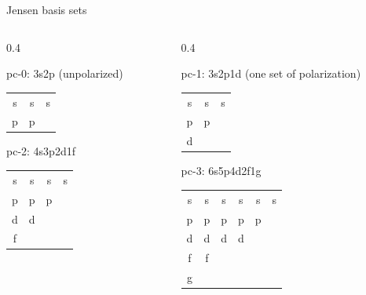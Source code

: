 \documentclass[aspectratio=169,9pt]{beamer}
\newcommand{\red}[1]{\textcolor{hfRed}{#1}}
\newcommand{\green}[1]{\textcolor{hfGreen}{#1}}
\newcommand{\blue}[1]{\textcolor{hfBlue}{#1}}
\newcommand{\violet}[1]{\textcolor{hfViolet}{#1}}
\begin{document}
\begin{frame}{Jensen basis sets}
\small
	\begin{columns}
		\begin{column}[t]{0.4\textwidth}
        	\begin{block}{pc-0: \small 3s2p (unpolarized)}
        		\begin{tabular}{ccc}
        			\green{s} & \green{s} & \green{s} \\
        			\green{p} & \green{p} \\
        		\end{tabular}
        	\end{block}
        	\begin{block}{pc-2: \small 4s3p2d1f}
        		\begin{tabular}{cccc}
        			\green{s} & \green{s} & \green{s} & \blue{s} \\
        			\green{p} & \green{p} & \blue{p} \\
        			\red{d} & \blue{d} \\
        			\blue{f} \\
        		\end{tabular}
        	\end{block}
		\end{column}
		\begin{column}[t]{0.4\textwidth}
        	\begin{block}{pc-1: \small 3s2p\red{1d} (one set of polarization)}
        		\begin{tabular}{ccc}
        			\green{s} & \green{s} & \green{s} \\
        			\green{p} & \green{p} \\
        			\red{d} 
        		\end{tabular}
        	\end{block}
        	\begin{block}{pc-3: \small 6s5p4d2f1g}
        		\begin{tabular}{cccccc}
        			\green{s} & \green{s} & \green{s} & \blue{s} & \violet{s} & \violet{s} \\
        			\green{p} & \green{p} & \blue{p} & \violet{p} & \violet{p} \\
        			\red{d} & \blue{d} & \violet{d} & \violet{d} \\
        			\blue{f} & \violet{f} \\
        			\violet{g} \\
        		\end{tabular}

\end{block}
\end{column}
\end{columns}
\end{frame}
\end{document}
